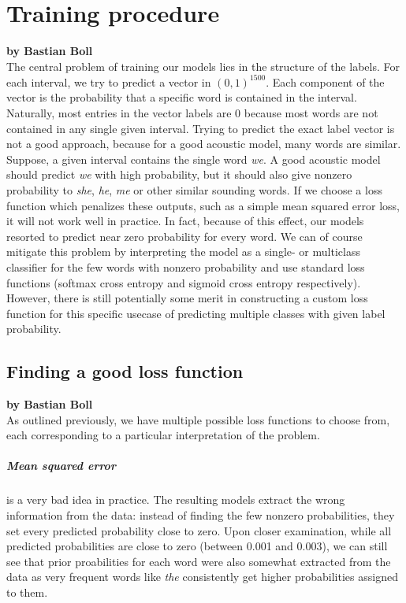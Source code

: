\chapter{Training procedure}

\textbf{by Bastian Boll} \\

The central problem of training our models lies in the structure of the labels. For each interval, we try to predict a vector in $(0,1)^{1500}$. Each component of the vector is the probability that a specific word is contained in the interval. Naturally, most entries in the vector labels are 0 because most words are not contained in any single given interval. Trying to predict the exact label vector is not a good approach, because for a good acoustic model, many words are similar. Suppose, a given interval contains the single word \emph{we}. A good acoustic model should predict \emph{we} with high probability, but it should also give nonzero probability to \emph{she}, \emph{he}, \emph{me} or other similar sounding words. If we choose a loss function which penalizes these outputs, such as a simple mean squared error loss, it will not work well in practice. In fact, because of this effect, our models resorted to predict near zero probability for every word. We can of course mitigate this problem by interpreting the model as a single- or multiclass classifier for the few words with nonzero probability and use standard loss functions (softmax cross entropy and sigmoid cross entropy respectively). However, there is still potentially some merit in constructing a custom loss function for this specific usecase of predicting multiple classes with given label probability.

\section{Finding a good loss function}

\textbf{by Bastian Boll} \\

As outlined previously, we have multiple possible loss functions to choose from, each corresponding to a particular interpretation of the problem.

\paragraph{Mean squared error} is a very bad idea in practice. The resulting models extract the wrong information from the data: instead of finding the few nonzero probabilities, they set every predicted probability close to zero. Upon closer examination, while all predicted probabilities are close to zero (between 0.001 and 0.003), we can still see that prior proabilities for each word were also somewhat extracted from the data as very frequent words like \emph{the} consistently get higher probabilities assigned to them.

